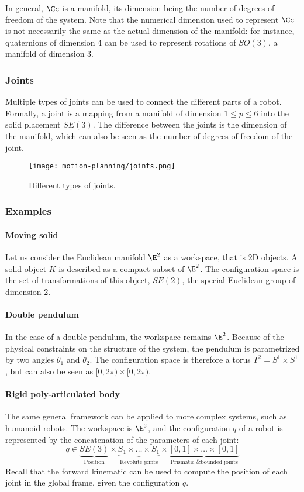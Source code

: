 In general, $\Cc$ is a manifold, its dimension being the number of degrees of freedom of the system. Note that the numerical dimension used to represent $\Cc$ is not necessarily the same as the actual dimension of the manifold: for instance, quaternions of dimension 4 can be used to represent rotations of $SO(3)$, a manifold of dimension 3.

\subsubsection{Joints}
Multiple types of joints can be used to connect the different parts of a robot. Formally, a joint is a mapping from a manifold of dimension $1\leq p\leq6$ into the solid placement $SE(3)$. The difference between the joints is the dimension of the manifold, which can also be seen as the number of degrees of freedom of the joint.
\begin{figure}
    \centering
    \texttt{[image: motion-planning/joints.png]}
    \caption{Different types of joints.}
\end{figure}

\subsubsection{Examples}
\paragraph*{Moving solid}
Let us consider the Euclidean manifold $\E^2$ as a workspace, that is 2D objects. A solid object $K$ is described as a compact subset of $\E^2$. The configuration space is the set of transformations of this object, $SE(2)$, the special Euclidean group of dimension 2.

\paragraph*{Double pendulum}
In the case of a double pendulum, the workspace remains $\E^2$. Because of the physical constraints on the structure of the system, the pendulum is parametrized by two angles $\theta_1$ and $\theta_2$. The configuration space is therefore a torus $T^2=S^1\times S^1$, but can also be seen as $[0,2\pi)\times[0,2\pi)$.

\paragraph*{Rigid poly-articulated body}
The same general framework can be applied to more complex systems, such as humanoid robots. The workspace is $\E^3$, and the configuration $q$ of a robot is represented by the concatenation of the parameters of each joint:
\begin{equation*}
    q\in \underbrace{SE(3)}_{\text{Position}} \times \underbrace{S_1\times \dots\times S_1}_{\text{Revolute joints}} \times \underbrace{[0,1]\times\dots\times[0,1]}_{\text{Prismatic \& bounded joints}}
\end{equation*}
Recall that the forward kinematic can be used to compute the position of each joint in the global frame, given the configuration $q$.

